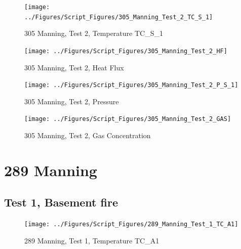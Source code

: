 \documentclass[12pt,oneside]{book}
\begin{document}
\begin{figure}[!ht]
\texttt{[image: ../Figures/Script\_Figures/305\_Manning\_Test\_2\_TC\_S\_1]}
\caption{305 Manning, Test 2, Temperature TC\_S\_1}
\label{fig:305_Manning_Test_2_TC_S_1}
\end{figure}

\begin{figure}[!ht]
\texttt{[image: ../Figures/Script\_Figures/305\_Manning\_Test\_2\_HF]}
\caption{305 Manning, Test 2, Heat Flux}
\label{fig:305_Manning_Test_2_HF}
\end{figure}

\begin{figure}[!ht]
\texttt{[image: ../Figures/Script\_Figures/305\_Manning\_Test\_2\_P\_S\_1]}
\caption{305 Manning, Test 2, Pressure}
\label{fig:305_Manning_Test_2_P_S_1}
\end{figure}

\begin{figure}[!ht]
\texttt{[image: ../Figures/Script\_Figures/305\_Manning\_Test\_2\_GAS]}
\caption{305 Manning, Test 2, Gas Concentration}
\label{fig:305_Manning_Test_2_GAS}
\end{figure}







\clearpage


\section{289 Manning}

\subsection{Test 1, Basement fire}

\begin{figure}[!ht]
\texttt{[image: ../Figures/Script\_Figures/289\_Manning\_Test\_1\_TC\_A1]}
\caption{289 Manning, Test 1, Temperature TC\_A1}
\label{fig:289_Manning_Test_1_TC_A1}
\end{figure}
\end{document}

